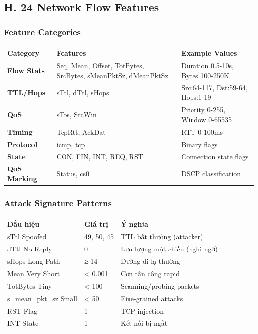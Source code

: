 \documentclass[12pt,a4paper]{article}
\begin{document}
\subsection{H. 24 Network Flow Features}

\subsubsection{Feature Categories}

\begin{table}[h]
\centering
\begin{tabularx}{\textwidth}{|l|X|X|}
\hline
\textbf{Category} & \textbf{Features} & \textbf{Example Values} \\
\hline
\textbf{Flow Stats} & Seq, Mean, Offset, TotBytes, SrcBytes, sMeanPktSz, dMeanPktSz & Duration 0.5-10s, Bytes 100-250K \\
\hline
\textbf{TTL/Hops} & sTtl, dTtl, sHops & Src:64-117, Dst:59-64, Hops:1-19 \\
\hline
\textbf{QoS} & sTos, SrcWin & Priority 0-255, Window 0-65535 \\
\hline
\textbf{Timing} & TcpRtt, AckDat & RTT 0-100ms \\
\hline
\textbf{Protocol} & icmp, tcp & Binary flags \\
\hline
\textbf{State} & CON, FIN, INT, REQ, RST & Connection state flags \\
\hline
\textbf{QoS Marking} & Status, cs0 & DSCP classification \\
\hline
\end{tabularx}
\end{table}

\subsubsection{Attack Signature Patterns}

\begin{table}[h]
\centering
\begin{tabularx}{\textwidth}{|l|l|X|}
\hline
\textbf{Dấu hiệu} & \textbf{Giá trị} & \textbf{Ý nghĩa} \\
\hline
sTtl Spoofed & 49, 50, 45 & TTL bất thường (attacker) \\
\hline
dTtl No Reply & 0 & Lưu lượng một chiều (nghi ngờ) \\
\hline
sHops Long Path & ≥ 14 & Đường đi lạ thường \\
\hline
Mean Very Short & < 0.001 & Cơn tấn công rapid \\
\hline
TotBytes Tiny & < 100 & Scanning/probing packets \\
\hline
s\_mean\_pkt\_sz Small & < 50 & Fine-grained attacks \\
\hline
RST Flag & 1 & TCP injection \\
\hline
INT State & 1 & Kết nối bị ngắt \\
\hline
\end{tabularx}
\end{table}
\end{document}
